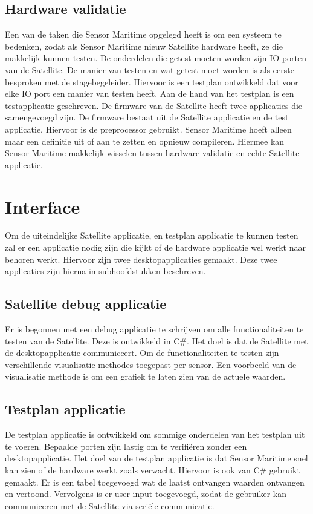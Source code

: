 \subsection{Hardware validatie}
Een van de taken die Sensor Maritime opgelegd heeft is om een systeem te bedenken, zodat als Sensor Maritime nieuw Satellite hardware heeft, ze die makkelijk kunnen testen. De onderdelen die getest moeten worden zijn IO porten van de Satellite. De manier van testen en wat getest moet worden is als eerste besproken met de stagebegeleider. Hiervoor is een testplan ontwikkeld dat voor elke IO port een manier van testen heeft. Aan de hand van het testplan is een testapplicatie geschreven. De firmware van de Satellite heeft twee applicaties die samengevoegd zijn. De firmware bestaat uit de Satellite applicatie en de test applicatie. Hiervoor is de preprocessor gebruikt. Sensor Maritime hoeft alleen maar een definitie uit of aan te zetten en opnieuw compileren. Hiermee kan Sensor Maritime makkelijk wisselen tussen hardware validatie en echte Satellite applicatie.

\section{Interface}
Om de uiteindelijke Satellite applicatie, en testplan applicatie te kunnen testen zal er een applicatie nodig zijn die kijkt of de hardware applicatie wel werkt naar behoren werkt. Hiervoor zijn twee desktopapplicaties gemaakt. Deze twee applicaties zijn hierna in subhoofdstukken beschreven.

\subsection{Satellite debug applicatie}
Er is begonnen met een debug applicatie te schrijven om alle functionaliteiten te testen van de Satellite. Deze is ontwikkeld in C\#. Het doel is dat de Satellite met de desktopapplicatie communiceert. Om de functionaliteiten te testen zijn verschillende visualisatie methodes toegepast per sensor. Een voorbeeld van de visualisatie methode is om een grafiek te laten zien van de actuele waarden. 

\subsection{Testplan applicatie}
De testplan applicatie is ontwikkeld om sommige onderdelen van het testplan uit te voeren. Bepaalde porten zijn lastig om te verifiëren zonder een desktopapplicatie. Het doel van de testplan applicatie is dat Sensor Maritime snel kan zien of de hardware werkt zoals verwacht. Hiervoor is ook van C\# gebruikt gemaakt. Er is een tabel toegevoegd wat de laatst ontvangen waarden ontvangen en vertoond. Vervolgens is er user input toegevoegd, zodat de gebruiker kan communiceren met de Satellite via seriële communicatie.

